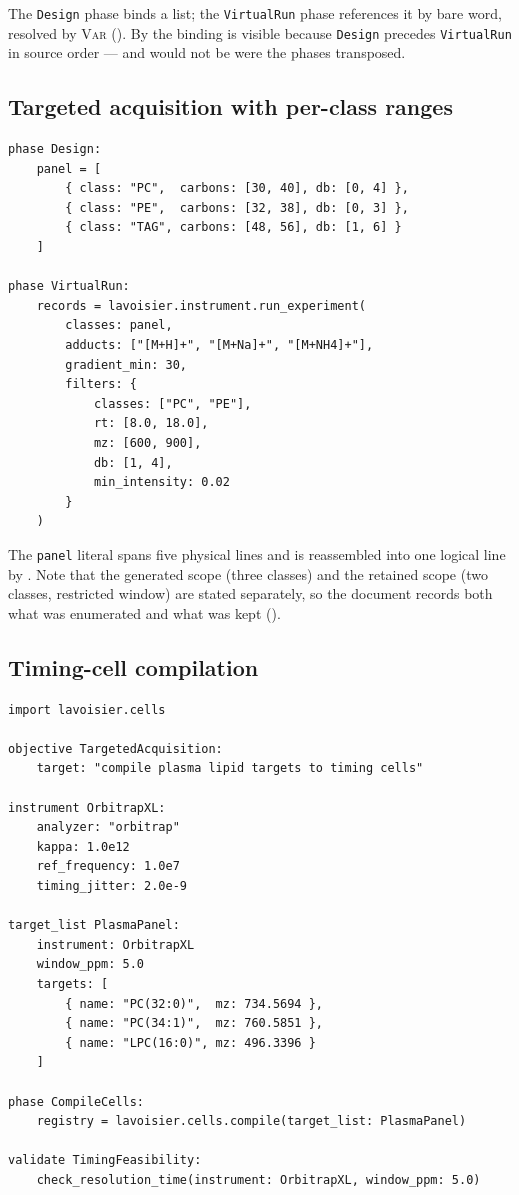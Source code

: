 \documentclass[11pt,twocolumn,a4paper]{article}
\theoremstyle{ssthm}
\theoremstyle{definition}
\theoremstyle{remark}
\newcommand{\shk}[1]{\texttt{#1}}
\begin{document}
The \shk{Design} phase binds a list; the \shk{VirtualRun} phase references
it by bare word, resolved by \textsc{Var} (). By
 the binding is visible because \shk{Design} precedes
\shk{VirtualRun} in source order --- and would not be were the phases
transposed.

\subsection{Targeted acquisition with per-class ranges}

\begin{lstlisting}[caption={Per-class ranges and post-generation filters.}]
phase Design:
    panel = [
        { class: "PC",  carbons: [30, 40], db: [0, 4] },
        { class: "PE",  carbons: [32, 38], db: [0, 3] },
        { class: "TAG", carbons: [48, 56], db: [1, 6] }
    ]

phase VirtualRun:
    records = lavoisier.instrument.run_experiment(
        classes: panel,
        adducts: ["[M+H]+", "[M+Na]+", "[M+NH4]+"],
        gradient_min: 30,
        filters: {
            classes: ["PC", "PE"],
            rt: [8.0, 18.0],
            mz: [600, 900],
            db: [1, 4],
            min_intensity: 0.02
        }
    )
\end{lstlisting}

The \shk{panel} literal spans five physical lines and is reassembled into
one logical line by . Note that the generated scope
(three classes) and the retained scope (two classes, restricted window)
are stated separately, so the document records both what was enumerated
and what was kept ().

\subsection{Timing-cell compilation}

\begin{lstlisting}[caption={Target list compiled to timing cells.}]
import lavoisier.cells

objective TargetedAcquisition:
    target: "compile plasma lipid targets to timing cells"

instrument OrbitrapXL:
    analyzer: "orbitrap"
    kappa: 1.0e12
    ref_frequency: 1.0e7
    timing_jitter: 2.0e-9

target_list PlasmaPanel:
    instrument: OrbitrapXL
    window_ppm: 5.0
    targets: [
        { name: "PC(32:0)",  mz: 734.5694 },
        { name: "PC(34:1)",  mz: 760.5851 },
        { name: "LPC(16:0)", mz: 496.3396 }
    ]

phase CompileCells:
    registry = lavoisier.cells.compile(target_list: PlasmaPanel)

validate TimingFeasibility:
    check_resolution_time(instrument: OrbitrapXL, window_ppm: 5.0)
\end{lstlisting}
\end{document}
